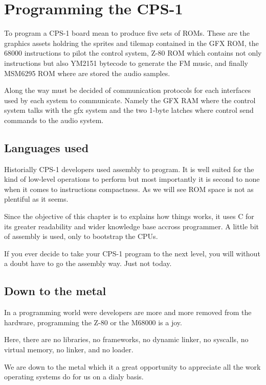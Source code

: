 \chapter{Programming the CPS-1}

To program a CPS-1 board mean to produce five sets of ROMs. These are the graphics assets holdring the sprites and tilemap contained in the GFX ROM, the 68000 instructions to pilot the control system, Z-80 ROM which contains not only instructions but also YM2151 bytecode to generate the FM music, and finally MSM6295 ROM where are stored the audio samples.


Along the way must be decided of communication protocols for each interfaces used by each system to communicate. Namely the GFX RAM where the control system talks with the gfx system and the two 1-byte latches where control send commands to the audio system.


\section{Languages used}
Historially CPS-1 developers used assembly to program. It is well suited for the kind of low-level operations to perform but most importantly it is second to none when it comes to instructions compactness. As we will see ROM space is not as plentiful as it seems.

Since the objective of this chapter is to explains how things works, it uses C for its greater readability and wider knowledge base accross programmer. A little bit of assembly is used, only to bootstrap the CPUs.

If you ever decide to take your CPS-1 program to the next level, you will without a doubt have to go the assembly way. Just not today.

\section{Down to the metal}
In a programming world were developers are more and more removed from the hardware, programming the Z-80 or the M68000 is a joy.

Here, there are no libraries, no frameworks, no dynamic linker, no syscalls, no virtual memory, no linker, and no loader.

We are down to the metal which it a great opportunity to appreciate all the work operating systems do for us on a dialy basis.

